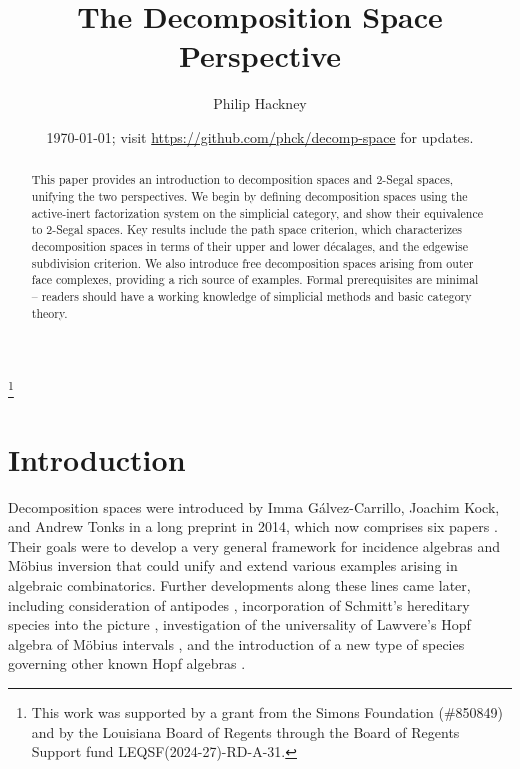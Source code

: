\documentclass{amsart}
\theoremstyle{definition}
\theoremstyle{remark}
\begin{document}
\title{The Decomposition Space Perspective}
\author{Philip Hackney}
\address{Department of Mathematics, University of Louisiana at Lafayette}
\thanks{This work was supported by a grant from the Simons Foundation (\#850849) and by the Louisiana Board of Regents through the Board of Regents Support fund LEQSF(2024-27)-RD-A-31.}

\date{\today; visit \url{https://github.com/phck/decomp-space} for updates.}



\begin{abstract}
This paper provides an introduction to decomposition spaces and 2-Segal spaces, unifying the two perspectives.
We begin by defining decomposition spaces using the active-inert factorization system on the simplicial category, and show their equivalence to 2-Segal spaces. 
Key results include the path space criterion, which characterizes decomposition spaces in terms of their upper and lower décalages, and the edgewise subdivision criterion. 
We also introduce free decomposition spaces arising from outer face complexes, providing a rich source of examples. 
Formal prerequisites are minimal -- readers should have a working knowledge of simplicial methods and basic category theory.
\end{abstract}

\maketitle

\section{Introduction}

Decomposition spaces were introduced by Imma G\'alvez-Carrillo, Joachim Kock, and Andrew Tonks in a long preprint in 2014, which now comprises six papers \cite{GKT1,GKT2,GKT3,GKT:DSC,GKT:DSRS,GKT:HLA}.
Their goals were to develop a very general framework for incidence algebras and Möbius inversion that could unify and extend various examples arising in algebraic combinatorics.
Further developments along these lines came later, including consideration of antipodes \cite{CarlierKock:AMDS}, incorporation of Schmitt's hereditary species into the picture \cite{Carlier:HSMDS}, investigation of the universality of Lawvere's Hopf algebra of M\"obius intervals \cite{Forero:GCKTCLDDS}, and the introduction of a new type of species governing other known Hopf algebras \cite{CebrianForero:DHSDS}.
\end{document}
